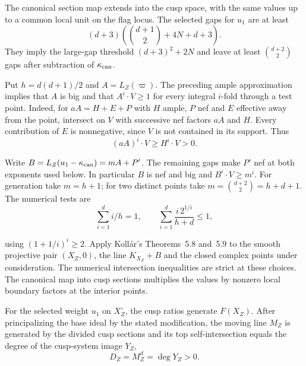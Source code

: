 The canonical section map extends into the cusp space,
with the same values up to a common local unit on the
flag locus. The selected gaps for \(u_1\) are at least
\[
 (d+3)\left(\binom{d+1}{2}+4N+d+3\right).
\]
They imply the large-gap threshold \((d+3)^2+2N\) and
leave at least \(\binom{d+2}{2}\) gaps after subtraction
of \(\kappa_{\rm can}\).

Put \(h=d(d+1)/2\) and \(A=L_Z(\varpi)\). The preceding ample
approximation implies that \(A\) is big and that \(A^i\cdot V\ge1\)
for every integral \(i\)-fold through a test point. Indeed, for
\(aA=H+E+P\) with \(H\) ample, \(P\) nef and \(E\) effective
away from the point, intersect on \(V\) with successive nef factors
\(aA\) and \(H\). Every contribution of \(E\) is nonnegative,
since \(V\) is not contained in its support. Thus
\[
 (aA)^i\cdot V\ge H^i\cdot V>0 .
\]

Write \(B=L_Z(u_1-\kappa_{\rm can})=mA+P'\). The remaining
gaps make \(P'\) nef at both exponents used below. In particular
\(B\) is nef and big and \(B^i\cdot V\ge m^i\). For generation
take \(m=h+1\); for two distinct points take
\(m=\binom{d+2}{2}=h+d+1\). The numerical tests are
\[
    \sum_{i=1}^d i/h=1,\qquad
    \sum_{i=1}^d\frac{i\,2^{1/i}}{h+d}\le1 ,
\]

using \((1+1/i)^i\ge2\). Apply Koll\'ar's Theorems~5.8 and~5.9 to
the smooth projective pair \((X_Z,0)\), the line \(K_{X_Z}+B\) and
the closed complex points under consideration. The numerical
intersection inequalities are strict at these choices. The canonical
map into cusp sections multiplies the values by nonzero local
boundary factors at the interior points.
\cite[Theorems~5.8--5.9]{kollar-pairs-adjoint}
\label{cor:covolume-component-ranks-2}

\begin{proposition}\label{prop:cusp-moving-system}
For the selected weight \(u_1\) on \(X_Z^\circ\), the cusp ratios generate \(F(X_Z)\). After
principalizing the base ideal by the stated modification,
the moving line \(M_Z\) is generated by the divided cusp
sections and its top self-intersection equals the degree of the cusp-system image \(Y_Z\),
\[
 D_Z=M_Z^d=\deg Y_Z>0.
\]

\end{proposition}

